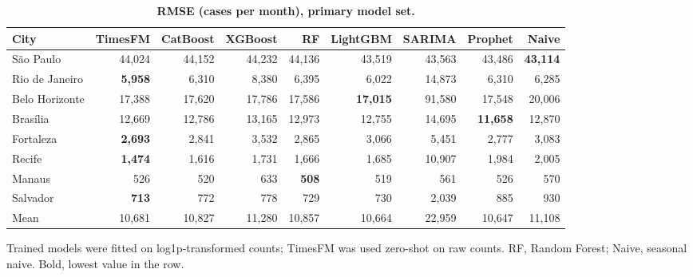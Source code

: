 \documentclass[10pt,letterpaper]{article}
\begin{document}
\begin{table}[!ht]
\centering
\small
\caption{\textbf{RMSE (cases per month), primary model set.}}
\begin{tabular}{lrrrrrrrr}
\toprule
City & TimesFM & CatBoost & XGBoost & RF & LightGBM & SARIMA & Prophet & Naive \\
\midrule
S\~ao Paulo & 44{,}024 & 44{,}152 & 44{,}232 & 44{,}136 & 43{,}519 & 43{,}563 & 43{,}486 & \textbf{43{,}114} \\
Rio de Janeiro & \textbf{5{,}958} & 6{,}310 & 8{,}380 & 6{,}395 & 6{,}022 & 14{,}873 & 6{,}310 & 6{,}285 \\
Belo Horizonte & 17{,}388 & 17{,}620 & 17{,}786 & 17{,}586 & \textbf{17{,}015} & 91{,}580 & 17{,}548 & 20{,}006 \\
Bras\'ilia & 12{,}669 & 12{,}786 & 13{,}165 & 12{,}973 & 12{,}755 & 14{,}695 & \textbf{11{,}658} & 12{,}870 \\
Fortaleza & \textbf{2{,}693} & 2{,}841 & 3{,}532 & 2{,}865 & 3{,}066 & 5{,}451 & 2{,}777 & 3{,}083 \\
Recife & \textbf{1{,}474} & 1{,}616 & 1{,}731 & 1{,}666 & 1{,}685 & 10{,}907 & 1{,}984 & 2{,}005 \\
Manaus & 526 & 520 & 633 & \textbf{508} & 519 & 561 & 526 & 570 \\
Salvador & \textbf{713} & 772 & 778 & 729 & 730 & 2{,}039 & 885 & 930 \\
\midrule
Mean & 10{,}681 & 10{,}827 & 11{,}280 & 10{,}857 & 10{,}664 & 22{,}959 & 10{,}647 & 11{,}108 \\
\bottomrule
\end{tabular}
\begin{flushleft} Trained models were fitted on log1p-transformed counts; TimesFM was used zero-shot on raw counts. RF, Random Forest; Naive, seasonal naive. Bold, lowest value in the row.
\end{flushleft}
\label{tabC}
\end{table}


\end{document}
